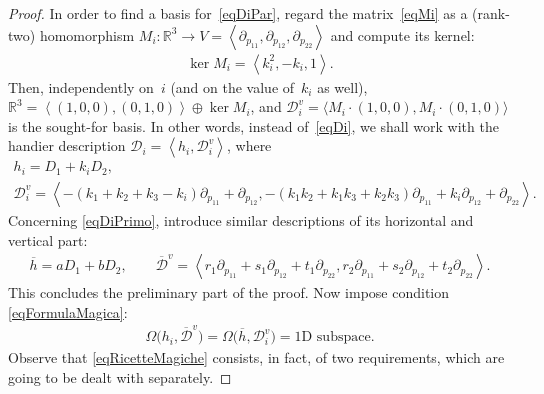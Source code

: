 \documentclass[10pt,a4paper]{amsart}
\newcommand{\R}{\mathbb{R}}
\newcommand{\D}{\mathcal{D}}
\newcommand{\Span}[1]{\left\langle #1 \right\rangle}
\numberwithin{equation}{section}
\begin{document}
\begin{proof}
In order to f\/ind a basis for~\eqref{eqDiPar}, regard the matrix~\eqref{eqMi} as a (rank-two) homomorphism $M_i\colon \R^3\longrightarrow V=\Span{\partial_{p_{11}},\partial_{p_{12}},\partial_{p_{22}}}$ and compute its kernel:
\begin{gather*}%
\ker M_i=\Span{k_i^2,-k_i,1}.
\end{gather*}
Then, independently on~$i$ (and on the value of~$k_i$ as well),
$\R^3=\Span{(1,0,0), (0,1,0)}\oplus \ker M_i$,
and
$\D_i^v=\langle M_i\cdot (1,0,0), M_i\cdot (0,1,0)\rangle$
 is the sought-for basis. In other words, instead of~\eqref{eqDi}, we shall work with the handier description
$\D_i=\Span{h_i, \D_i^v}$,
where
\begin{gather}
h_i = D_1 + k_iD_2 ,\nonumber\\
\D_i^v = \Span{ -(k_1+k_2+k_3-k_i) \partial_{p_{11}} + \partial_{p_{12}}, -(k_1k_2+k_1k_3+k_2k_3)\partial_{p_{11}}+k_i \partial_{p_{12}}+ \partial_{p_{22}} }.\label{eqDiV}
\end{gather}
Concerning \eqref{eqDiPrimo}, introduce similar descriptions of its horizontal and vertical part:
\begin{gather}
\overline{h} = aD_1+bD_2,\qquad
\overline{\D}^v = \Span{r_1\partial_{p_{11}}+s_1 \partial_{p_{12}}+t_1 \partial_{p_{22}},r_2\partial_{p_{11}}+s_2 \partial_{p_{12}}+t_2 \partial_{p_{22}}}.\label{eqVprimo}
\end{gather}
This concludes the preliminary part of the proof. Now impose condition \eqref{eqFormulaMagica}:
\begin{gather}\label{eqRicetteMagiche}
\Omega\big(h_i,\overline{\D}^v\big)=\Omega\big(\overline{h},\D_i^v\big)=\textrm{1D subspace}.
\end{gather}
Observe that \eqref{eqRicetteMagiche} consists, in fact, of two requirements, which are going to be dealt with separately.


\end{proof}
\end{document}
